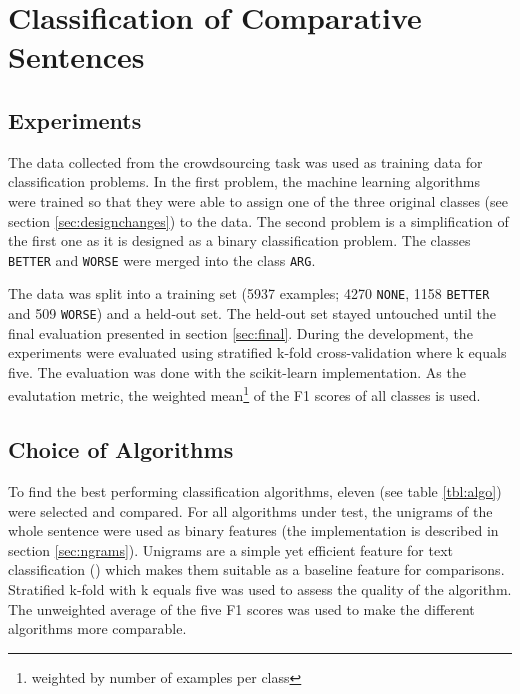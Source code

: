 \chapter{Classification of Comparative Sentences}
\section{Experiments}
The data collected from the crowdsourcing task was used as training data for classification problems. In the first problem, the machine learning algorithms were trained so that they were able to assign one of the three original classes (see section \ref{sec:designchanges}) to the data. The second problem is a simplification of the first one as it is designed as a binary classification problem. The classes \texttt{BETTER} and \texttt{WORSE} were merged into the class \texttt{ARG}.


The data was split into a training set (5937 examples; 4270 \texttt{NONE}, 1158 \texttt{BETTER} and 509 \texttt{WORSE}) and a held-out set. The held-out set stayed untouched until the final evaluation presented in section \ref{sec:final}. During the development, the experiments were evaluated using stratified k-fold cross-validation where k equals five. The evaluation was done with the scikit-learn implementation. As the evalutation metric, the weighted mean\footnote{weighted by number of examples per class} of the F1 scores of all classes is used. 

\section{Choice of Algorithms}
To find the best performing classification algorithms, eleven (see table \ref{tbl:algo}) were selected and compared. For all algorithms under test, the unigrams of the whole sentence were used as binary features (the implementation is described in section \ref{sec:ngrams}). Unigrams are a simple yet efficient feature for text classification (\cite{cavnar1994n}) which makes them suitable as a baseline feature for comparisons. Stratified k-fold with k equals five was used to assess the quality of the algorithm. The unweighted average of the five F1 scores was used to make the different algorithms more comparable.

